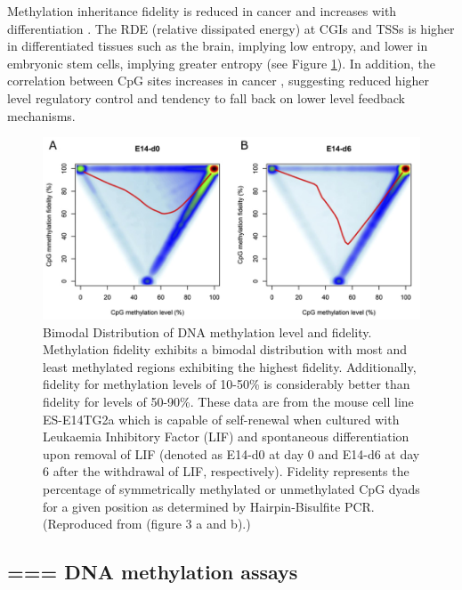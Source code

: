 \documentclass[
]{book}
\begin{document}
Methylation inheritance fidelity is reduced in cancer \citep{Ushijima2005} and increases with differentiation \citep{Zhao2014}. The RDE (relative dissipated energy) at CGIs and TSSs is higher in differentiated tissues such as the brain, implying low entropy, and lower in embryonic stem cells, implying greater entropy \citep{Jenkinson2017} (see Figure \ref{fig:Zhao2014fig3ab}). In addition, the correlation between CpG sites increases in cancer \citep{Jenkinson2017}, suggesting reduced higher level regulatory control and tendency to fall back on lower level feedback mechanisms.

\begin{figure}
\includegraphics[width=12.76in]{figs/Zhao2014_fig3_a+b} \caption{Bimodal Distribution of DNA methylation level and fidelity.
Methylation fidelity exhibits a bimodal distribution with most and least methylated regions exhibiting the highest fidelity. Additionally, fidelity for methylation levels of 10-50\% is considerably better than fidelity for levels of 50-90\%. These data are from the mouse cell line ES-E14TG2a which is capable of self-renewal when cultured with Leukaemia Inhibitory Factor (LIF) and spontaneous differentiation upon removal of LIF (denoted as E14-d0 at day 0 and E14-d6 at day 6 after the withdrawal of LIF, respectively). Fidelity represents the percentage of symmetrically methylated or unmethylated CpG dyads for a given position as determined by Hairpin-Bisulfite PCR. (Reproduced from \citet{Zhao2014} (figure 3 a and b).)}\label{fig:Zhao2014fig3ab}
\end{figure}




\hypertarget{dna-methylation-assays}{%
\subsection{=== DNA methylation assays}\label{dna-methylation-assays}}
\end{document}
